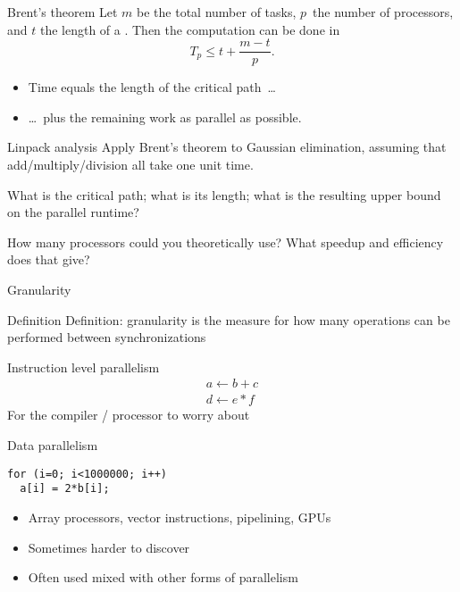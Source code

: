 \begin{numberedframe}{Brent's theorem}
    Let $m$ be the total number of tasks, $p$~the number of processors,
  and $t$ the length of a . Then
  the computation can be done in \[ T_p \leq t +\frac{m-t}{p}. \]

  \begin{itemize}
  \item Time equals the length of the critical path~\ldots
  \item \ldots~plus the remaining work as parallel as possible.
  \end{itemize}
\end{numberedframe}

\begin{exercise}{Linpack analysis}
  Apply Brent's theorem to Gaussian elimination,
  assuming that add/multiply/division all take one unit time.

  What is the critical path; what is its length; what is the resulting upper bound
  on the parallel runtime?
  
  How many processors could you theoretically use?
  What speedup and efficiency does that give?
\end{exercise}

 {Granularity}

\begin{numberedframe}{Definition}
  Definition: granularity is the measure for how many 
  operations can be performed between synchronizations
\end{numberedframe}

\begin{numberedframe}{Instruction level parallelism}
\[ 
\begin{array}{l}
  a\leftarrow b+c\\ d\leftarrow e*f
\end{array}
\]
For the compiler / processor to worry about
\end{numberedframe}

\begin{numberedframe}{Data parallelism}
\begin{lstlisting}
for (i=0; i<1000000; i++)
  a[i] = 2*b[i];
\end{lstlisting}
\begin{itemize}
\item Array processors, vector instructions, pipelining, GPUs
\item Sometimes harder to discover
\item Often used mixed with other forms of parallelism
\end{itemize}
\end{numberedframe}

